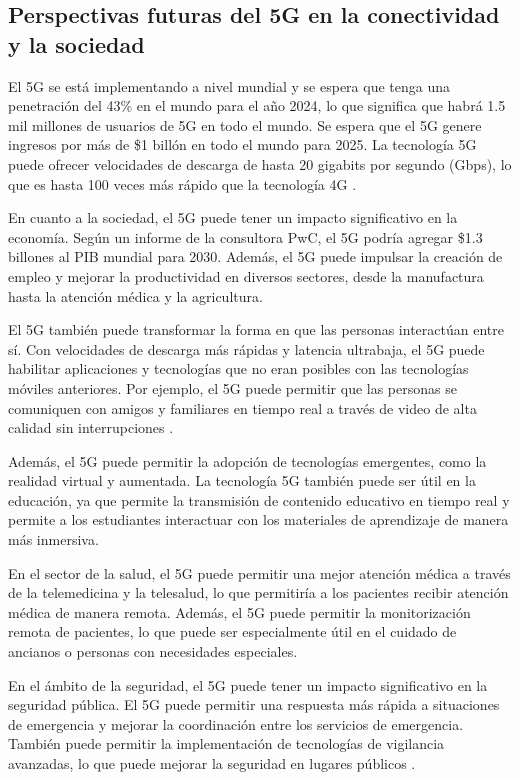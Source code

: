 \documentclass[12pt]{article}
\begin{document}
        \subsection{Perspectivas futuras del 5G en la conectividad y la sociedad}

            El 5G se está implementando a nivel mundial y se espera que tenga una penetración del 43\% en el mundo para el año 2024, lo que significa que habrá 1.5 mil millones de usuarios de 5G en todo el mundo. Se espera que el 5G genere ingresos por más de \$1 billón en todo el mundo para 2025. La tecnología 5G puede ofrecer velocidades de descarga de hasta 20 gigabits por segundo (Gbps), lo que es hasta 100 veces más rápido que la tecnología 4G \cite{ITU2019}.
            
            En cuanto a la sociedad, el 5G puede tener un impacto significativo en la economía. Según un informe de la consultora PwC, el 5G podría agregar \$1.3 billones al PIB mundial para 2030. Además, el 5G puede impulsar la creación de empleo y mejorar la productividad en diversos sectores, desde la manufactura hasta la atención médica y la agricultura.
            
            El 5G también puede transformar la forma en que las personas interactúan entre sí. Con velocidades de descarga más rápidas y latencia ultrabaja, el 5G puede habilitar aplicaciones y tecnologías que no eran posibles con las tecnologías móviles anteriores. Por ejemplo, el 5G puede permitir que las personas se comuniquen con amigos y familiares en tiempo real a través de video de alta calidad sin interrupciones \cite{Shah2021}.
            
            Además, el 5G puede permitir la adopción de tecnologías emergentes, como la realidad virtual y aumentada. La tecnología 5G también puede ser útil en la educación, ya que permite la transmisión de contenido educativo en tiempo real y permite a los estudiantes interactuar con los materiales de aprendizaje de manera más inmersiva.
            
            En el sector de la salud, el 5G puede permitir una mejor atención médica a través de la telemedicina y la telesalud, lo que permitiría a los pacientes recibir atención médica de manera remota. Además, el 5G puede permitir la monitorización remota de pacientes, lo que puede ser especialmente útil en el cuidado de ancianos o personas con necesidades especiales.
            
            En el ámbito de la seguridad, el 5G puede tener un impacto significativo en la seguridad pública. El 5G puede permitir una respuesta más rápida a situaciones de emergencia y mejorar la coordinación entre los servicios de emergencia. También puede permitir la implementación de tecnologías de vigilancia avanzadas, lo que puede mejorar la seguridad en lugares públicos \cite{ITU2019}.
            
\end{document}
